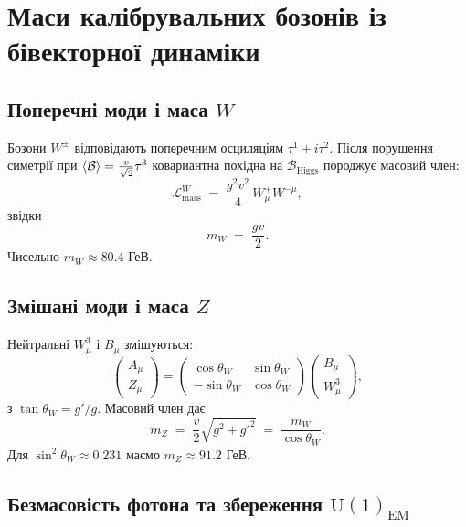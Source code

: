 \documentclass[11pt,a4paper]{article}
\newcommand{\Biv}{\mathcal{B}}
\newcommand{\UU}{\mathrm{U}}
\newcommand{\Lag}{\mathcal{L}}
\theoremstyle{definition}
\theoremstyle{plain}
\theoremstyle{remark}
\begin{document}
\vspace{1em}

\section{Маси калібрувальних бозонів із бівекторної динаміки}\label{sec:gauge-masses}

\subsection{Поперечні моди і маса $W$}

Бозони $W^\pm$ відповідають поперечним осциляціям $\tau^1 \pm i\tau^2$. Після порушення симетрії при $\ev{\Biv} = \frac{v}{\sqrt{2}}\tau^3$ ковариантна похідна на $\Biv_{\text{Higgs}}$ породжує масовий член:
\begin{equation}
  \Lag_{\text{mass}}^{W} \;=\; \frac{g^2 v^2}{4}\,W_\mu^+ W^{-\mu},
\end{equation}
звідки
\begin{equation}
  \boxed{m_W \;=\; \frac{gv}{2}.}
\end{equation}
Чисельно $m_W \approx 80{.}4$ ГеВ.

\subsection{Змішані моди і маса $Z$}

Нейтральні $W_\mu^3$ і $B_\mu$ змішуються:
\begin{equation}
  \begin{pmatrix} A_\mu \\ Z_\mu \end{pmatrix}
  =
  \begin{pmatrix}
  \cos\theta_W & \sin\theta_W \\
  -\sin\theta_W & \cos\theta_W
  \end{pmatrix}
  \begin{pmatrix} B_\mu \\ W_\mu^3 \end{pmatrix},
\end{equation}
з $\tan\theta_W = g'/g$. Масовий член дає
\begin{equation}
  \boxed{m_Z \;=\; \frac{v}{2}\sqrt{g^2 + g'^2} \;=\; \frac{m_W}{\cos\theta_W}.}
\end{equation}
Для $\sin^2\theta_W \approx 0{.}231$ маємо $m_Z \approx 91{.}2$ ГеВ.

\subsection{Безмасовість фотона та збереження $\UU(1)_{\text{EM}}$}
\end{document}

